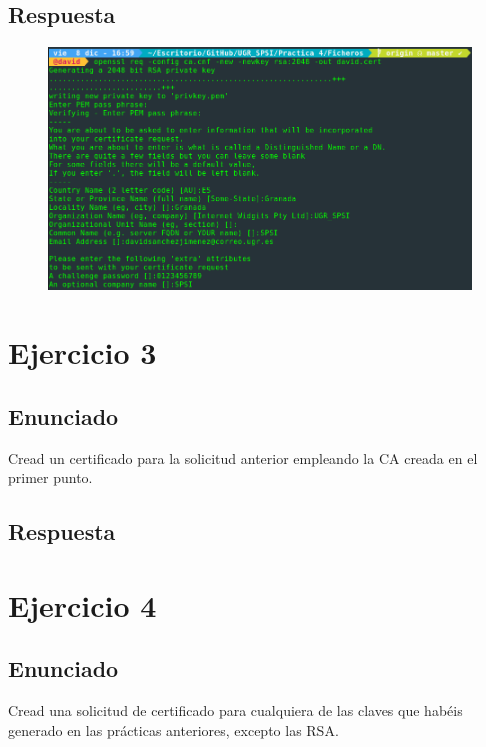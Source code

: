 \documentclass[10pt,a4paper,spanish]{report}
\begin{document}
\section{Respuesta}
\noindent

\begin{figure}[!hbp]
 \centering  \includegraphics[width=1\textwidth]{./Imagenes/2.png}
\end{figure}

\chapter{Ejercicio 3}

\section{Enunciado}
\noindent
Cread un certificado para la solicitud anterior empleando la CA creada en el primer punto.

\section{Respuesta}
\noindent

\chapter{Ejercicio 4}

\section{Enunciado}
\noindent
Cread una solicitud de certificado para cualquiera de las claves que habéis generado en las prácticas anteriores, excepto las RSA.
\end{document}
